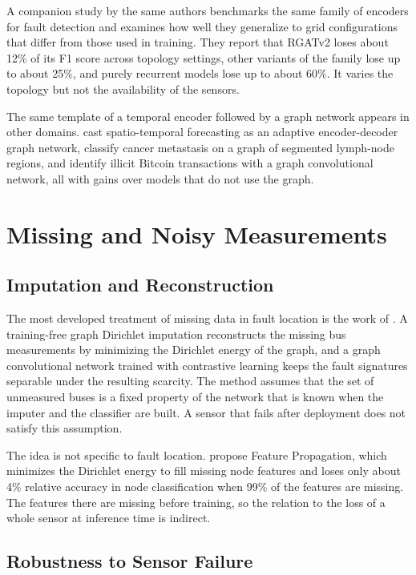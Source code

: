 \documentclass[MTech]{ugthesis}
\begin{document}
A companion study by the same authors \citep{karabulut2025} benchmarks the same family of encoders for fault detection and examines how well they generalize to grid configurations that differ from those used in training. They report that RGATv2 loses about 12\% of its F1 score across topology settings, other variants of the family lose up to about 25\%, and purely recurrent models lose up to about 60\%. It varies the topology but not the availability of the sensors.

The same template of a temporal encoder followed by a graph network appears in other domains. \citet{sachin2025} cast spatio-temporal forecasting as an adaptive encoder-decoder graph network, \citet{jayapal2025} classify cancer metastasis on a graph of segmented lymph-node regions, and \citet{asiri2025} identify illicit Bitcoin transactions with a graph convolutional network, all with gains over models that do not use the graph.

\section{Missing and Noisy Measurements}

\subsection{Imputation and Reconstruction}

The most developed treatment of missing data in fault location is the work of \citet{zhang2025}. A training-free graph Dirichlet imputation reconstructs the missing bus measurements by minimizing the Dirichlet energy of the graph, and a graph convolutional network trained with contrastive learning keeps the fault signatures separable under the resulting scarcity. The method assumes that the set of unmeasured buses is a fixed property of the network that is known when the imputer and the classifier are built. A sensor that fails after deployment does not satisfy this assumption.

The idea is not specific to fault location. \citet{rossi2021} propose Feature Propagation, which minimizes the Dirichlet energy to fill missing node features and loses only about 4\% relative accuracy in node classification when 99\% of the features are missing. The features there are missing before training, so the relation to the loss of a whole sensor at inference time is indirect.

\subsection{Robustness to Sensor Failure}
\end{document}
